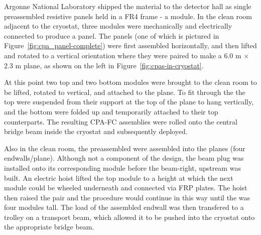 Argonne National Laboratory shipped the  material to the detector hall as single preassembled resistive panels held in a FR4 frame - a  module. 
In the clean room adjacent to the  cryostat, three  modules were mechanically and electrically connected to produce a  panel. %
The  panels (one of which is pictured in Figure~\ref{fig:cpa_panel-complete}) were first assembled horizontally, and then lifted and rotated to a vertical orientation where they were paired to make a 6.0 m $\times$ 2.3 m  plane, as shown on the left in Figure~\ref{fig:cpas-in-cryostat}.

At this point two top and two bottom  modules were brought to the clean room to be lifted, rotated to vertical, and attached to the  plane. 
To fit through the  the top  were suspended from their support at the top of the  plane to hang vertically, and the bottom  were folded up and temporarily attached to their top  counterparts.
The resulting CPA-FC assemblies were rolled onto the central bridge beam inside the cryostat and subsequently deployed. 

Also in the  clean room, the preassembled  %
were assembled into the  planes (four endwalls/plane). %
Although not a component of the  design, 
the beam plug was installed onto its corresponding module %
before the beam-right, upstream  was built.
An electric hoist lifted the top %
module to a height at which the next %
module could be wheeled underneath and connected via FRP plates.
The hoist then raised the pair and the procedure would continue in this way until the  was four %
modules tall.
The load of the assembled endwall was then transfered to a trolley on a transport beam, which allowed it to be pushed into the cryostat onto the appropriate bridge beam.

